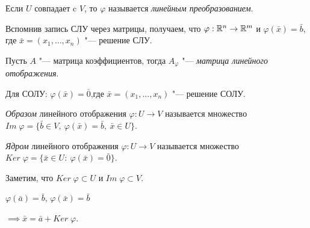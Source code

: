 Если $U$ совпадает c $V$, то $\varphi$ называется \textit{линейным преобразованием}.

Вспомнив запись СЛУ через матрицы, получаем, что 
$\varphi: \mathbb{R}^n \to \mathbb{R}^m$ и $\varphi(\bar{x}) = \bar{b}$, где $\bar{x} = (x_1, \ldots, x_n)$ "--- решение СЛУ.

Пусть  $A$ "--- матрица коэффициентов, тогда $A_\varphi$ "--- \textit{матрица линейного отображения}.

Для СОЛУ: $\varphi(\bar{x}) = \bar{0}$,где $\bar{x} = (x_1, \ldots, x_n)$ "--- решение СОЛУ.
\begin{definition}
    \textit{Образом} линейного отображения $\varphi: U \to V$ называется множество $Im\;\varphi = \{\bar{b} \in V, ~\varphi(\bar{x}) = \bar{b}, ~\bar{x} \in U \}$.
\end{definition}
\begin{definition}
    \label{def:core_lin}
    \textit{Ядром} линейного отображения $\varphi: U \to V$ называется множество $Ker\;\varphi = \{\bar{x} \in U:~\varphi({\bar{x}}) = \bar{0} \}$.
\end{definition}
Заметим, что $Ker\;\varphi \subset U$ и $Im\;\varphi \subset V$.

\begin{theorem}
    $\varphi(\bar{a}) = \bar{b}$, $\varphi(\bar{x}) = \bar{b}$

    $\implies \bar{x} = \bar{a} + Ker\;\varphi$.
\end{theorem}


